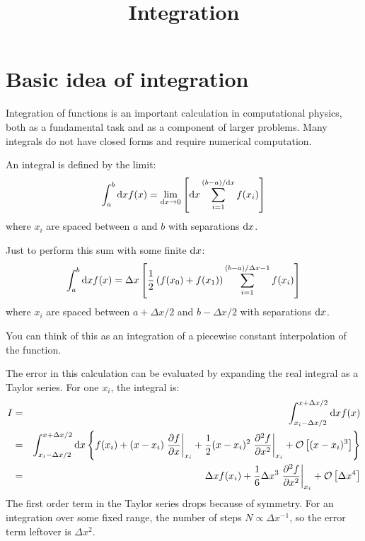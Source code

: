 \title{Integration}

\section{Basic idea of integration}

Integration of functions is an important calculation in computational
physics, both as a fundamental task and as a component of larger
problems. Many integrals do not have closed forms and require
numerical computation.


\begin{answer}
An integral is defined by the limit:
\begin{equation}
\int_a^b {\rm d}x f(x) = \lim_{{\rm d}x \rightarrow 0} \left[{\rm d}x
  \sum_{i=1}^{(b-a)/{\rm d}x} f(x_i) \right]
\end{equation}
where $x_i$ are spaced between $a$ and $b$ with separations ${\rm
  d}x$.
\end{answer}


\begin{answer}
Just to perform this sum with some finite ${\rm d}x$:
\begin{equation}
\int_a^b {\rm d}x f(x) = {\Delta}x \left[
\frac{1}{2} \left(f(x_0) + f(x_1)\right)
\sum_{i=1}^{(b-a)/{\Delta}x - 1} f(x_i) \right]
\end{equation}
where $x_i$ are spaced between $a + \Delta x / 2$ and $b - \Delta x
 /2$ with separations ${\rm d}x$.

You can think of this as an integration of a piecewise constant
interpolation of the function.
\end{answer}

The error in this calculation can be evaluated by expanding the real
integral as a Taylor series. For one $x_i$, the integral is:
\begin{eqnarray}
I &=& \int_{x_i-\Delta x/2}^{x+\Delta x/2} {\rm d}x f(x) \cr
&=& \int_{x_i-\Delta x/2}^{x+\Delta x/2} {\rm d}x
\left\{f(x_i) +
(x - x_i) \left.\frac{\partial f}{\partial x}\right|_{x_i} +
\frac{1}{2} (x - x_i)^2 
\left.\frac{\partial^2 f}{\partial x^2}\right|_{x_i} +
\mathcal{O}\left[(x-x_i)^3\right]\right\} \cr
&=& \Delta x f(x_i) + 
\frac{1}{6} \Delta x^3
\left.\frac{\partial^2 f}{\partial x^2}\right|_{x_i} +
\mathcal{O}\left[\Delta x^4\right]
\end{eqnarray}
The first order term in the Taylor series drops because of symmetry.
For an integration over some fixed range, the number of steps
$N\propto \Delta x^{-1}$, so the error term leftover is $\Delta x^2$.


